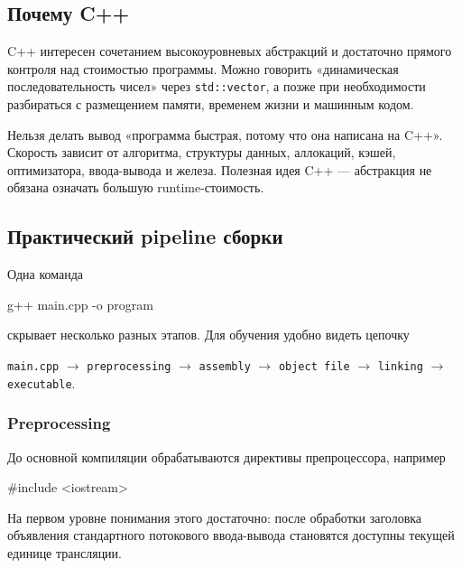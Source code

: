 \subsection{Почему C++}

C++ интересен сочетанием высокоуровневых абстракций и достаточно прямого
контроля над стоимостью программы. Можно говорить «динамическая
последовательность чисел» через \texttt{std::vector}, а позже при
необходимости разбираться с размещением памяти, временем жизни и машинным
кодом.

\begin{performancebox}
Нельзя делать вывод «программа быстрая, потому что она написана на C++».
Скорость зависит от алгоритма, структуры данных, аллокаций, кэшей,
оптимизатора, ввода-вывода и железа. Полезная идея C++ --- абстракция
не обязана означать большую runtime-стоимость.
\end{performancebox}

\subsection{Практический pipeline сборки}

Одна команда

\begin{shellcode}
g++ main.cpp -o program
\end{shellcode}

скрывает несколько разных этапов. Для обучения удобно видеть цепочку

\begin{center}
\texttt{main.cpp}
$\rightarrow$
\texttt{preprocessing}
$\rightarrow$
\texttt{assembly}
$\rightarrow$
\texttt{object file}
$\rightarrow$
\texttt{linking}
$\rightarrow$
\texttt{executable}.
\end{center}

\subsubsection{Preprocessing}

До основной компиляции обрабатываются директивы препроцессора, например

\begin{cppcodeplain}
#include <iostream>
\end{cppcodeplain}

На первом уровне понимания этого достаточно: после обработки заголовка
объявления стандартного потокового ввода-вывода становятся доступны текущей
единице трансляции.

